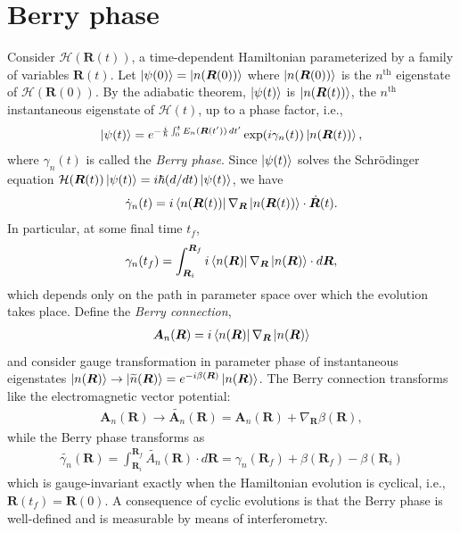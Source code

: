 \documentclass[reprint,
nofootinbib,
amsmath,amssymb,
aps]{revtex4-1}
\newcommand{\f}[2]{\frac{#1}{#2}}
\begin{document}
\section{Berry phase}\label{sect:berry}
Consider $\mathcal{H}(\bm{R}(t))$, a time-dependent Hamiltonian parameterized by a family of variables $\bm{R}(t)$. Let $\ket{\psi(0)} = \ket{n(\bm{R}(0))}$ where $\ket{n(\bm{R}(0))}$ is the $n^\text{th}$ eigenstate of $\mathcal{H}(\bm{R}(0))$. By the adiabatic theorem, $\ket{\psi(t)}$ is $\ket{n(\bm{R}(t))}$, the $n^\text{th}$ instantaneous eigenstate of $\mathcal{H}(t)$, up to a phase factor, i.e.,
\begin{align*}
\ket{\psi(t)} = e^{ -\f{i}{\hbar }\int_0^t E_n(\bm{R} (t'))\,dt' } \exp(i\gamma_n(t)) \ket{n(\bm{R}(t))},
\end{align*}
where $\gamma_n(t)$ is called the \textit{Berry phase}. Since $\ket{\psi(t)}$ solves the Schr\"{o}dinger equation $\mathcal{H}(\bm{R}(t)) \ket{\psi(t)} = i\hbar (d/dt) \ket{{\psi}(t)}$, we have 
\begin{align*}
\dot{\gamma}_n(t) = i \bra{n(\bm{R}(t))} \nabla_{\bm{R}}  \ket{n(\bm{R}(t)) } \cdot \dot{\bm{R}}(t).
\end{align*}
In particular, at some final time $t_f$,
\begin{align}\label{eq:def}
\gamma_n(t_f) =   \int^{\bm{R}_f}_{\bm{R}_i} i \bra{n(\bm{R})} \nabla_{\bm{R}}  \ket{n(\bm{R}) } \cdot d{\bm{R}},
\end{align} 
which depends only on the path in parameter space over which the evolution takes place. Define the \textit{Berry connection}, 
\begin{align*}
\bm{A}_n(\bm{R}) = i \bra{n(\bm{R})} \nabla_{\bm{R}}  \ket{n(\bm{R}) }
\end{align*} 
and consider gauge transformation in parameter phase of instantaneous eigenstates $\ket{n(\bm{R})} \to \ket{\widetilde{n}(\bm{R})} = e^{-i\beta(\bm{R})}\ket{n(\bm{R})}$. The Berry connection transforms like the electromagnetic  vector potential:
\begin{align*}
\bm{A}_n(\bm{R}) \to  \widetilde{\bm{A}_n}(\bm{R}) = \bm{A}_n(\bm{R}) + \nabla_{\bm{R}} \beta (\bm{R}),
\end{align*}
while the Berry phase transforms as
\begin{align*}
\widetilde{\gamma_n} (\bm{R}) = \int_{\bm{R}_i}^{\bm{R}_f} \widetilde{A_n}(\bm{R})\cdot d\bm{R} = \gamma_n(\bm{R}_f)  + \beta(\bm{R}_f) - \beta({\bm{R}_i})
\end{align*}
which is gauge-invariant exactly when the Hamiltonian evolution is cyclical, i.e., $\bm{R}(t_f) = \bm{R}(0)$. A consequence of cyclic evolutions is that the Berry phase is well-defined and is measurable by means of interferometry. 
\end{document}
